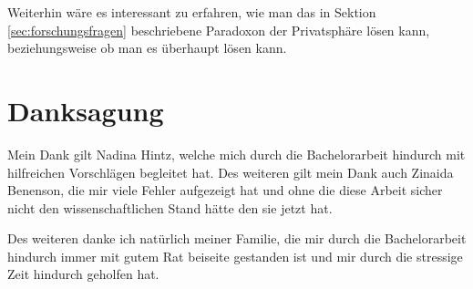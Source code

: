 Weiterhin wäre es interessant zu erfahren, wie man das in Sektion \ref{sec:forschungsfragen} beschriebene Paradoxon der Privatsphäre lösen kann, beziehungsweise ob man es überhaupt lösen kann.


\section{Danksagung}
Mein Dank gilt Nadina Hintz, welche mich durch die Bachelorarbeit hindurch mit hilfreichen Vorschlägen begleitet hat. Des weiteren gilt mein Dank auch Zinaida Benenson, die mir viele Fehler aufgezeigt hat und ohne die diese Arbeit sicher nicht den wissenschaftlichen Stand hätte den sie jetzt hat.

Des weiteren danke ich natürlich meiner Familie, die mir durch die Bachelorarbeit hindurch immer mit gutem Rat beiseite gestanden ist und mir durch die stressige Zeit hindurch geholfen hat.